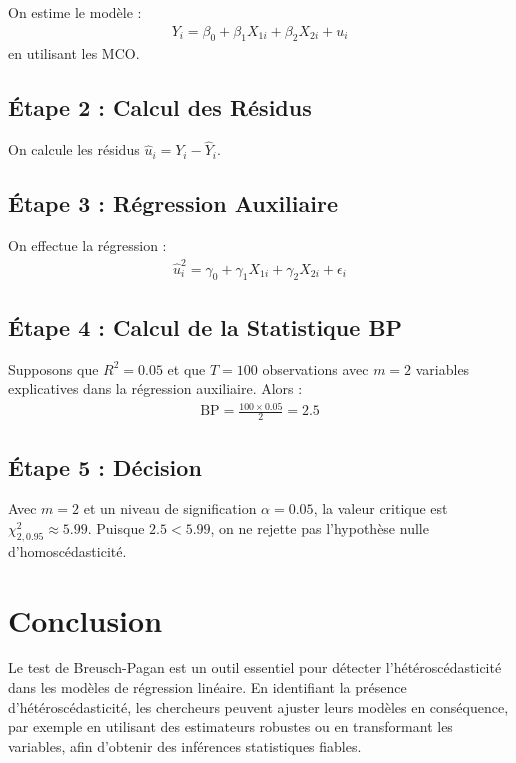 \documentclass[14pt]{extarticle} %
\theoremstyle{definition}
\theoremstyle{plain}
\begin{document}
On estime le modèle :
\begin{align*}
    Y_i = \beta_0 + \beta_1 X_{1i} + \beta_2 X_{2i} + u_i
\end{align*}
en utilisant les MCO.

\subsection{Étape 2 : Calcul des Résidus}

On calcule les résidus $\hat{u}_i = Y_i - \hat{Y}_i$.

\subsection{Étape 3 : Régression Auxiliaire}

On effectue la régression :
\begin{align*}
    \hat{u}_i^2 = \gamma_0 + \gamma_1 X_{1i} + \gamma_2 X_{2i} + \epsilon_i
\end{align*}

\subsection{Étape 4 : Calcul de la Statistique BP}

Supposons que $R^2 = 0.05$ et que $T = 100$ observations avec $m = 2$ variables explicatives dans la régression auxiliaire. Alors :
\begin{align*}
    \text{BP} = \frac{100 \times 0.05}{2} = 2.5
\end{align*}

\subsection{Étape 5 : Décision}

Avec $m = 2$ et un niveau de signification $\alpha = 0.05$, la valeur critique est $\chi^2_{2, 0.95} \approx 5.99$. Puisque $2.5 < 5.99$, on ne rejette pas l'hypothèse nulle d'homoscédasticité.

\section{Conclusion}

Le test de Breusch-Pagan est un outil essentiel pour détecter l'hétéroscédasticité dans les modèles de régression linéaire. En identifiant la présence d'hétéroscédasticité, les chercheurs peuvent ajuster leurs modèles en conséquence, par exemple en utilisant des estimateurs robustes ou en transformant les variables, afin d'obtenir des inférences statistiques fiables.
\end{document}
